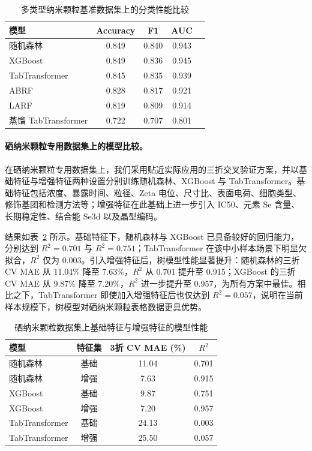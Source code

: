 \begin{table}[htbp]
  \centering
  \caption{多类型纳米颗粒基准数据集上的分类性能比较}
  \label{tab:benchmark_classification}
  \begin{tabular}{lcccc}
    \hline
    模型 & Accuracy & F1 & AUC \\
    \hline
    随机森林 & 0.849 & 0.840 & 0.943 \\
    XGBoost & 0.849 & 0.836 & 0.945 \\
    TabTransformer & 0.845 & 0.835 & 0.939 \\
    ABRF & 0.828 & 0.817 & 0.921 \\
    LARF & 0.819 & 0.809 & 0.914 \\
    蒸馏 TabTransformer & 0.722 & 0.707 & 0.801 \\
    \hline
  \end{tabular}
\end{table}

\paragraph{硒纳米颗粒专用数据集上的模型比较。}
在硒纳米颗粒专用数据集上，我们采用贴近实际应用的三折交叉验证方案，并以基础特征与增强特征两种设置分别训练随机森林、XGBoost 与 TabTransformer。基础特征包括浓度、暴露时间、粒径、Zeta 电位、尺寸比、表面电荷、细胞类型、修饰基团和检测方法等；增强特征在此基础上进一步引入 IC50、元素 Se 含量、长期稳定性、结合能 Se3d 以及晶型编码。

结果如表~\ref{tab:senp_main_results} 所示。基础特征下，随机森林与 XGBoost 已具备较好的回归能力，分别达到 $R^2=0.701$ 与 $R^2=0.751$；TabTransformer 在该中小样本场景下明显欠拟合，$R^2$ 仅为 0.003。引入增强特征后，树模型性能显著提升：随机森林的三折 CV MAE 从 11.04\% 降至 7.63\%，$R^2$ 从 0.701 提升至 0.915；XGBoost 的三折 CV MAE 从 9.87\% 降至 7.20\%，$R^2$ 进一步提升至 0.957，为所有方案中最佳。相比之下，TabTransformer 即使加入增强特征后也仅达到 $R^2=0.057$，说明在当前样本规模下，树模型对硒纳米颗粒表格数据更具优势。

\begin{table}[htbp]
  \centering
  \caption{硒纳米颗粒数据集上基础特征与增强特征的模型性能}
  \label{tab:senp_main_results}
  \begin{tabular}{lccc}
    \hline
    模型 & 特征集 & 3折 CV MAE (\%) & $R^2$ \\
    \hline
    随机森林 & 基础 & 11.04 & 0.701 \\
    随机森林 & 增强 & 7.63 & 0.915 \\
    XGBoost & 基础 & 9.87 & 0.751 \\
    XGBoost & 增强 & 7.20 & 0.957 \\
    TabTransformer & 基础 & 24.13 & 0.003 \\
    TabTransformer & 增强 & 25.50 & 0.057 \\
    \hline
  \end{tabular}
\end{table}

